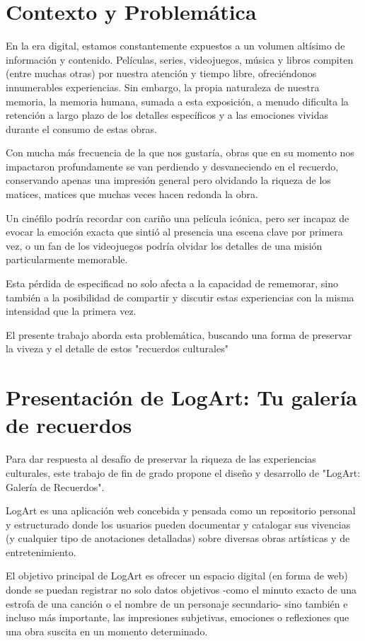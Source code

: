 
\section{Contexto y Problemática}

En la era digital, estamos constantemente expuestos a un volumen altísimo de información y contenido. Películas, series, videojuegos, música y libros compiten (entre muchas otras) por nuestra atención y tiempo libre, ofreciéndonos innumerables experiencias. Sin embargo, la propia naturaleza de nuestra memoria, la memoria humana, sumada a esta exposición, a menudo dificulta la retención a largo plazo de los detalles específicos y a las emociones vividas durante el consumo de estas obras.

Con mucha más frecuencia de la que nos gustaría, obras que en su momento nos impactaron profundamente se van perdiendo y desvaneciendo en el recuerdo, conservando apenas una impresión general pero olvidando la riqueza de los matices, matices que muchas veces hacen redonda la obra.

Un cinéfilo podría recordar con cariño una película icónica, pero ser incapaz de evocar la emoción exacta que sintió al presencia una escena clave por primera vez, o un fan de los videojuegos podría olvidar los detalles de una misión particularmente memorable. 

Esta pérdida de especificad no solo afecta a la capacidad de rememorar, sino también a la posibilidad de compartir y discutir estas experiencias con la misma intensidad que la primera vez.

El presente trabajo aborda esta problemática, buscando una forma de preservar la viveza y el detalle de estos "recuerdos culturales"

\section{Presentación de LogArt: Tu galería de recuerdos}

Para dar respuesta al desafío de preservar la riqueza de las experiencias culturales, este trabajo de fin de grado propone el diseño y desarrollo de "LogArt: Galería de Recuerdos".

LogArt es una aplicación web concebida y pensada como un repositorio personal y estructurado donde los usuarios pueden documentar y catalogar sus vivencias (y cualquier tipo de anotaciones detalladas) sobre diversas obras artísticas y de entretenimiento.

El objetivo principal de LogArt es ofrecer un espacio digital (en forma de web) donde se puedan registrar no solo datos objetivos -como el minuto exacto de una estrofa de una canción o el nombre de un personaje secundario- sino también e incluso más importante, las impresiones subjetivas, emociones o reflexiones que una obra suscita en un momento determinado.

